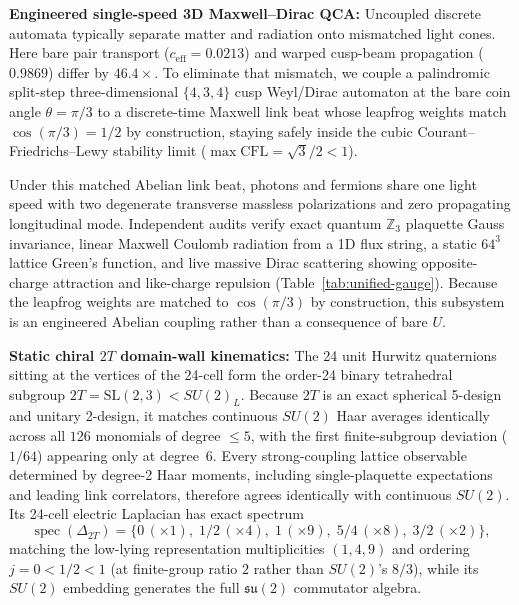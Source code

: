 \textbf{Engineered single-speed 3D Maxwell--Dirac QCA:} Uncoupled discrete automata typically separate matter and
radiation onto mismatched light cones. Here bare pair transport ($c_{\mathrm{eff}} = 0.0213$) and warped cusp-beam
propagation ($0.9869$) differ by $46.4\times$. To eliminate that mismatch, we couple a palindromic split-step
three-dimensional $\{4,3,4\}$ cusp Weyl/Dirac automaton at the bare coin angle $\theta = \pi/3$ to a discrete-time
Maxwell link beat whose leapfrog weights match $\cos(\pi/3) = 1/2$ by construction, staying safely inside the cubic
Courant--Friedrichs--Lewy stability limit ($\max\mathrm{CFL} = \sqrt{3}/2 < 1$).

Under this matched Abelian link beat, photons and fermions share one light speed with two degenerate transverse massless
polarizations and zero propagating longitudinal mode. Independent audits verify exact quantum $\mathbb{Z}_3$ plaquette
Gauss invariance, linear Maxwell Coulomb radiation from a 1D flux string, a static $64^3$ lattice Green's function, and
live massive Dirac scattering showing opposite-charge attraction and like-charge repulsion
(Table~\ref{tab:unified-gauge}). Because the leapfrog weights are matched to $\cos(\pi/3)$ by construction, this
subsystem is an engineered Abelian coupling rather than a consequence of bare $U$.

\textbf{Static chiral $2T$ domain-wall kinematics:} The 24 unit Hurwitz quaternions sitting at the vertices of the
24-cell form the order-24 binary tetrahedral subgroup $2T = \mathrm{SL}(2,3) < SU(2)_L$. Because $2T$ is an exact
spherical 5-design and unitary 2-design, it matches continuous $SU(2)$ Haar averages identically across all $126$
monomials of degree $\le 5$, with the first finite-subgroup deviation ($1/64$) appearing only at degree~6. Every
strong-coupling lattice observable determined by degree-2 Haar moments, including single-plaquette expectations and
leading link correlators, therefore agrees identically with continuous $SU(2)$. Its 24-cell electric Laplacian has exact
spectrum
\begin{equation}
\operatorname{spec}(\Delta_{2T})
= \bigl\{0\,(\times 1),\; 1/2\,(\times 4),\; 1\,(\times 9),\; 5/4\,(\times 8),\; 3/2\,(\times 2)\bigr\},
\label{eq:2t-spectrum}
\end{equation}
matching the low-lying representation multiplicities $(1, 4, 9)$ and ordering $j = 0 < 1/2 < 1$ (at finite-group ratio
$2$ rather than $SU(2)$'s $8/3$), while its $SU(2)$ embedding generates the full $\mathfrak{su}(2)$ commutator algebra.

